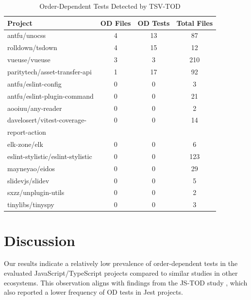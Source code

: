 \documentclass[10pt, conference]{IEEEtran}
\begin{document}
\begin{table}[htbp]
\caption{Order-Dependent Tests Detected by TSV-TOD}
\begin{center}
\begin{tabular}{lccc}
\toprule
\textbf{Project} & \textbf{OD Files} & \textbf{OD Tests} & \textbf{Total Files} \\
\midrule
antfu/unocss & 4 & 13 & 87 \\
rolldown/tsdown & 4 & 15 & 12 \\
vueuse/vueuse & 3 & 3 & 210 \\
paritytech/asset-transfer-api & 1 & 17 & 92 \\
antfu/eslint-config & 0 & 0 & 3 \\
antfu/eslint-plugin-command & 0 & 0 & 21 \\
aooiuu/any-reader & 0 & 0 & 2 \\
davelosert/vitest-coverage- & 0 & 0 & 14 \\
report-action & \\
elk-zone/elk & 0 & 0 & 6 \\
eslint-stylistic/eslint-stylistic & 0 & 0 & 123 \\
mayneyao/eidos & 0 & 0 & 29 \\
slidevjs/slidev & 0 & 0 & 5 \\
sxzz/unplugin-utils & 0 & 0 & 2 \\
tinylibs/tinyspy & 0 & 0 & 3 \\
\bottomrule
\end{tabular}
\label{tab:results}
\end{center}
\end{table}

\section{Discussion}
Our results indicate a relatively low prevalence of order-dependent tests in the evaluated JavaScript/TypeScript projects compared to similar studies in other ecosystems. This observation aligns with findings from the JS-TOD study \cite{hashemi2025detecting}, which also reported a lower frequency of OD tests in Jest projects.
\end{document}
